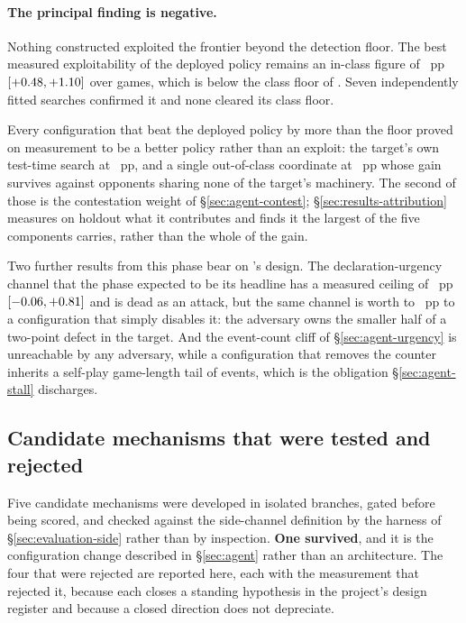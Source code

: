 \paragraph{The principal finding is negative.}
Nothing constructed exploited the \vsix{} frontier beyond
the detection floor. The best measured exploitability of the deployed policy remains an in-class
figure of \vsevenBestExploit{}~pp $[+0.48, +1.10]$ over
\vsevenBestExploitN{} games, which is below the class floor of \vsevenPrimaryFloor{}. Seven
independently fitted searches confirmed it and none cleared its class floor.

Every configuration that beat the deployed policy by more than the floor proved on measurement to be
a better policy rather than an exploit: the target's own test-time search at
\vsevenSearchAsExploit{}~pp, and a single out-of-class coordinate at \vsevenOneSwitchArm{}~pp whose
gain survives against opponents sharing none of the target's machinery. The second of those is the
contestation weight of \S\ref{sec:agent-contest}; \S\ref{sec:results-attribution} measures on
holdout what it contributes and finds it the largest of the five components \sestina{} carries,
rather than the whole of the gain.

Two further results from this phase bear on \sestina{}'s design. The declaration-urgency channel
that the phase expected to be its headline has a measured ceiling of \vsevenUrgencyCeiling{}~pp
$[-0.06, +0.81]$ and is dead as an attack, but the same channel is
worth \vsevenUrgencyWorthLo{} to \vsevenUrgencyWorthHi{}~pp to a configuration that simply disables
it: the adversary owns the smaller half of a two-point defect in the target. And the event-count
cliff of \S\ref{sec:agent-urgency} is unreachable by any adversary, while a configuration that removes
the counter inherits a self-play game-length tail of \vsevenCliffTail{} events, which is the
obligation \S\ref{sec:agent-stall} discharges.

\subsection{Candidate mechanisms that were tested and rejected}
\label{sec:development-rejected}

Five candidate mechanisms were developed in isolated branches, gated before being scored, and checked against the side-channel definition by the
harness of \S\ref{sec:evaluation-side} rather
than by inspection. \textbf{One survived}, and it is the configuration change described in
\S\ref{sec:agent} rather than an architecture. The four that were rejected are reported here, each
with the measurement that rejected it, because each closes a standing hypothesis in the project's
design register and because a closed direction does not depreciate.

